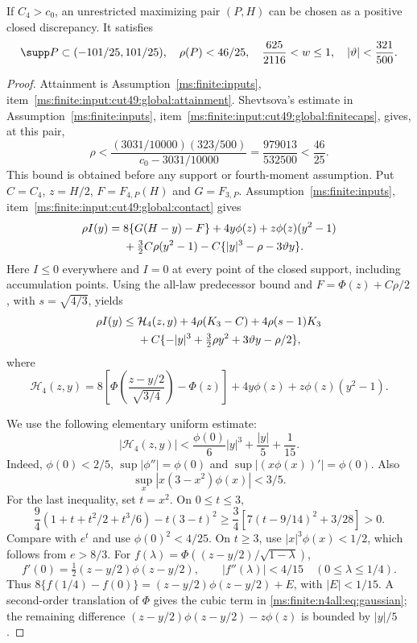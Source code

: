 \begin{lemma}\label{ms:finite:n4all:lem:owner}
If $C_4>c_0$, an unrestricted maximizing pair $(P,H)$ can be chosen
as a positive closed discrepancy. It satisfies
\begin{equation}\label{ms:finite:n4all:eq:owner-class}
 \supp P\subset(-101/25,101/25),\quad
 \rho(P)<46/25,\quad
 \frac{625}{2116}<w\le1,\quad |\vartheta|<\frac{321}{500}.
\end{equation}
\end{lemma}
\begin{proof}
Attainment is Assumption~\ref{ms:finite:inputs}, item~\ref{ms:finite:input:cut49:global:attainment}.
Shevtsova's estimate in Assumption~\ref{ms:finite:inputs}, item~\ref{ms:finite:input:cut49:global:finitecaps}, gives, at this pair,
\[
 \rho<\frac{(3031/10000)(323/500)}{c_0-3031/10000}
       =\frac{979013}{532500}<\frac{46}{25}.
\]
This bound is obtained before any support or fourth-moment assumption.
Put $C=C_4$, $z=H/2$, $F=F_{4,P}(H)$ and $G=F_{3,P}$.
Assumption~\ref{ms:finite:inputs}, item~\ref{ms:finite:input:cut49:global:contact} gives
\begin{align}
 \rho I(y)={}&8\{G(H-y)-F\}+4y\phi(z)+z\phi(z)(y^2-1)\notag\\
 &+\tfrac32C\rho(y^2-1)
   -C\{|y|^3-\rho-3\vartheta y\}.\label{ms:finite:n4all:eq:contact}
\end{align}
Here $I\le0$ everywhere and $I=0$ at every point of the closed
support, including accumulation points. Using the all-law predecessor
bound and $F=\Phi(z)+C\rho/2$, with $s=\sqrt{4/3}$, yields
\begin{align}
 \rho I(y)\le{}&\mathcal H_4(z,y)+4\rho(K_3-C)
                  +4\rho(s-1)K_3\notag\\
 &+C\{-|y|^3+\tfrac32\rho y^2+3\vartheta y-\rho/2\},
 \label{ms:finite:n4all:eq:predecessor}
\end{align}
where
\[
 \mathcal H_4(z,y)=
 8\left[\Phi\!\left(\frac{z-y/2}{\sqrt{3/4}}\right)-\Phi(z)\right]
 +4y\phi(z)+z\phi(z)(y^2-1).
\]

We use the following elementary uniform estimate:
\begin{equation}\label{ms:finite:n4all:eq:gaussian}
 |\mathcal H_4(z,y)|<\frac{\phi(0)}6|y|^3+\frac{|y|}{5}+\frac1{15}.
\end{equation}
Indeed, $\phi(0)<2/5$, $\sup|\phi''|=\phi(0)$ and
$\sup|(x\phi(x))'|=\phi(0)$. Also
\[
 \sup_x|x(3-x^2)\phi(x)|<3/5.
\]
For the last inequality, set $t=x^2$. On $0\le t\le3$,
\[
 \frac94(1+t+t^2/2+t^3/6)-t(3-t)^2
 \ge\frac34\left[7(t-9/14)^2+3/28\right]>0.
\]
Compare with $e^t$ and use $\phi(0)^2<4/25$.
On $t\ge3$, use $|x|^3\phi(x)<1/2$, which follows from $e>8/3$.
For $f(\lambda)=\Phi((z-y/2)/\sqrt{1-\lambda})$,
\[
 f'(0)=\tfrac12(z-y/2)\phi(z-y/2),\qquad
 |f''(\lambda)|<4/15\quad(0\le\lambda\le1/4).
\]
Thus $8\{f(1/4)-f(0)\}=(z-y/2)\phi(z-y/2)+E$, with
$|E|<1/15$. A second-order translation of $\Phi$ gives the cubic
term in \eqref{ms:finite:n4all:eq:gaussian}; the remaining difference
$(z-y/2)\phi(z-y/2)-z\phi(z)$ is bounded by $|y|/5$.


\end{proof}
